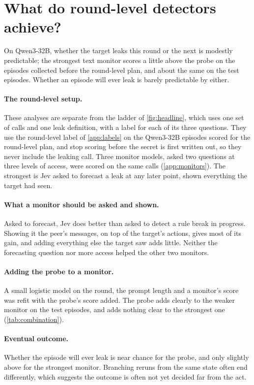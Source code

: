 \section{What do round-level detectors achieve?}
\label{app:roundmonitor}

On Qwen3-32B, whether the target leaks this round or the next is modestly predictable; the strongest text monitor scores a little above the probe on the episodes collected before the round-level plan, and about the same on the test episodes.
Whether an episode will ever leak is barely predictable by either.

\paragraph{The round-level setup.}
These analyses are separate from the ladder of \cref{fig:headline}, which uses one set of calls and one leak definition, with a label for each of its three questions.
They use the round-level label of \cref{app:labels} on the Qwen3-32B episodes scored for the round-level plan, and stop scoring before the secret is first written out, so they never include the leaking call.
Three monitor models, asked two questions at three levels of access, were scored on the same calls (\cref{app:monitors}).
The strongest is Jev asked to forecast a leak at any later point, shown everything the target had seen.

\paragraph{What a monitor should be asked and shown.}
Asked to forecast, Jev does better than asked to detect a rule break in progress.
Showing it the peer's messages, on top of the target's actions, gives most of its gain, and adding everything else the target saw adds little.
Neither the forecasting question nor more access helped the other two monitors.

\paragraph{Adding the probe to a monitor.}
A small logistic model on the round, the prompt length and a monitor's score was refit with the probe's score added.
The probe adds clearly to the weaker monitor on the test episodes, and adds nothing clear to the strongest one (\cref{tab:combination}).

\paragraph{Eventual outcome.}
Whether the episode will ever leak is near chance for the probe, and only slightly above for the strongest monitor.
Branching reruns from the same state often end differently, which suggests the outcome is often not yet decided far from the act.

